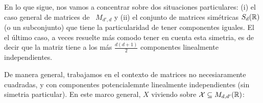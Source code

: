 En lo que sigue, nos vamos  a concentrar sobre dos situaciones particulares: (i)
el  caso general de  matrices de  \ $M_{d',d}$  y (ii)  el conjunto  de matrices
sim\'etricas  $S_d(\mathbb{R})$ (o  un subconjunto)  que tiene  la  particularidad de
tener componentes  iguales. El el \'ultimo  caso, a veces  resuelte m\'as comodo
tener en  cuenta esta  simetria, es  de decir que  la matriz  tiene a  los m\'as
$\frac{d (d+1)}{2}$ componentes linealmente independientes.






De  manera general,  trabajamos en  el  contexto de  matrices no  necesiaramente
cuadradas,  y  con componentes  potencialemnte  linealmente independientes  (sin
simetria particular).  En este marco  general, $X$ viviendo sobre  $\mathcal{X} \subseteq
M_{d,d'}(\mathbb{R})$:
%
